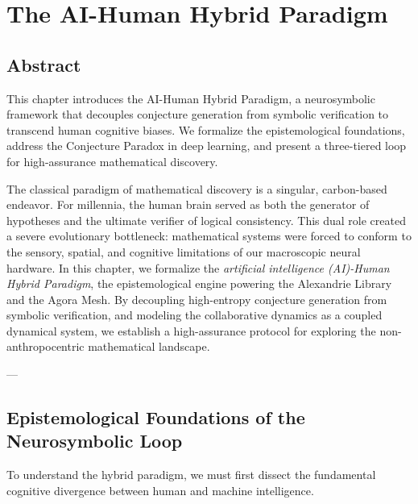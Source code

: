 \documentclass[11pt,a4paper]{book}
\begin{document}
\chapter{The AI-Human Hybrid Paradigm}
\label{ch3:ai_human_hybrid}

\section*{Abstract}
This chapter introduces the AI-Human Hybrid Paradigm, a neurosymbolic framework that decouples conjecture generation from symbolic verification to transcend human cognitive biases. We formalize the epistemological foundations, address the Conjecture Paradox in deep learning, and present a three-tiered loop for high-assurance mathematical discovery.


The classical paradigm of mathematical discovery is a singular, carbon-based endeavor. For millennia, the human brain served as both the generator of hypotheses and the ultimate verifier of logical consistency. This dual role created a severe evolutionary bottleneck: mathematical systems were forced to conform to the sensory, spatial, and cognitive limitations of our macroscopic neural hardware. In this chapter, we formalize the \textit{artificial intelligence (AI)-Human Hybrid Paradigm}, the epistemological engine powering the Alexandrie Library and the Agora Mesh. By decoupling high-entropy conjecture generation from symbolic verification, and modeling the collaborative dynamics as a coupled dynamical system, we establish a high-assurance protocol for exploring the non-anthropocentric mathematical landscape.

---

\section{Epistemological Foundations of the Neurosymbolic Loop}
\label{sec:epistemological_foundations}

To understand the hybrid paradigm, we must first dissect the fundamental cognitive divergence between human and machine intelligence. 
\end{document}
